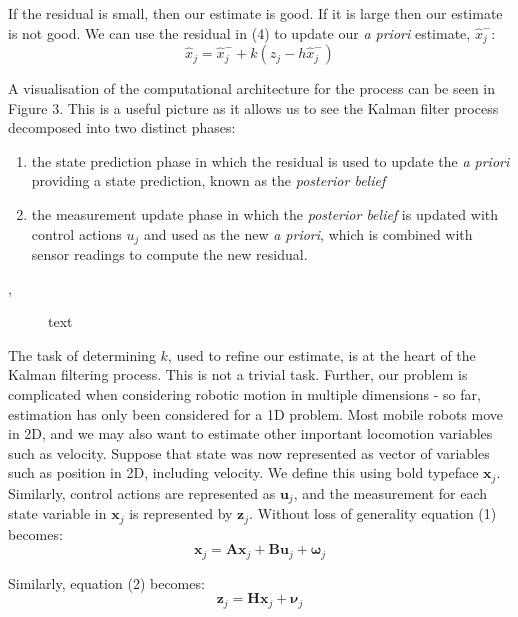 \documentclass[a4paper]{article}
\begin{document}
If the residual is small, then our estimate is good. If it is large then our estimate is not good. We can use the residual in (4) to update our \textit{a priori} estimate, $\hat{x}^-_j$:
\begin{equation}
\hat{x}_j = \hat{x}^-_j + k (z_j - h \hat{x}^-_j)
\end{equation}

A visualisation of the computational architecture for the process can be seen in Figure 3. This is a useful picture as it allows us to see the Kalman filter process decomposed into two distinct phases:
\begin{enumerate}
\item the state prediction phase in which the residual is used to update the \textit{a priori} providing a state prediction, known as the \textit{posterior belief}
\item the measurement update phase in which the \textit{posterior belief} is updated with control actions $u_j$ and used as the new \textit{a priori}, which is combined with sensor readings to compute the new residual.
\end{enumerate}, 
\begin{figure}[h]
\centering

\caption{text}
\end{figure}

The task of determining $k$, used to refine our estimate, is at the heart of the Kalman filtering process. This is not a trivial task. Further, our problem is complicated when considering robotic motion in multiple dimensions - so far, estimation has only been considered for a 1D problem. Most mobile robots move in 2D, and we may also want to estimate other important locomotion variables such as velocity. Suppose that state was now represented as vector of variables such as position in 2D, including velocity. We define this using bold typeface $\mathbf{x}_j$. Similarly, control actions are represented as $\mathbf{u}_j$, and the measurement for each state variable in $\mathbf{x}_j$ is represented by $\mathbf{z}_j$. Without loss of generality equation (1) becomes:
\begin{equation}
\mathbf{x}_j = \mathbf{A} \mathbf{x}_j + \mathbf{B} \mathbf{u}_j + \boldsymbol{\omega}_j
\end{equation}

Similarly, equation (2) becomes:
\begin{equation}
\mathbf{z}_j = \mathbf{H} \mathbf{x}_j + \boldsymbol{\nu}_j
\end{equation}
\end{document}
